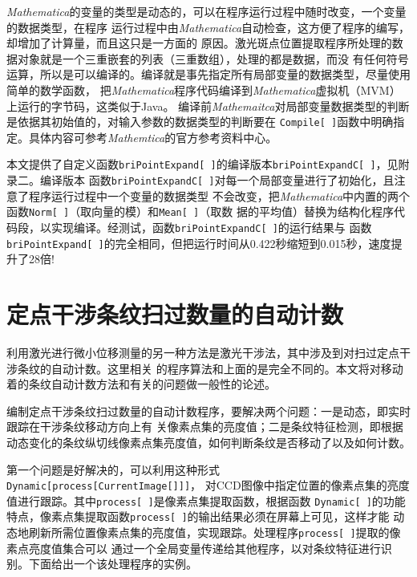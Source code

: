 \documentclass[UTF8,a4paper,12pt]{article}
\begin{document}
\textit{Mathematica}的变量的类型是动态的，可以在程序运行过程中随时改变，一个变量的数据类型，在程序
运行过程中由\textit{Mathematica}自动检查，这方便了程序的编写，却增加了计算量，而且这只是一方面的
原因。激光斑点位置提取程序所处理的数据对象就是一个三重嵌套的列表（三重数组），处理的都是数据，而没
有任何符号运算，所以是可以编译的。编译就是事先指定所有局部变量的数据类型，尽量使用简单的数学函数，
把\textit{Mathematica}程序代码编译到\textit{Mathematica}虚拟机（MVM）上运行的字节码，这类似于Java。
编译前\textit{Mathemaitca}对局部变量数据类型的判断是依据其初始值的，对输入参数的数据类型的判断要在
\verb|Compile[ ]|函数中明确指定。具体内容可参考\textit{Mathemtica}的官方参考资料中心。

本文提供了自定义函数\verb|briPointExpand[ ]|的编译版本\verb|briPointExpandC[ ]|，见附录二。编译版本
函数\verb|briPointExpandC[ ]|对每一个局部变量进行了初始化，且注意了程序运行过程中一个变量的数据类型
不会改变，把\textit{Mathematica}中内置的两个函数\verb|Norm[ ]|（取向量的模）和\verb|Mean[ ]|（取数
据的平均值）替换为结构化程序代码段，以实现编译。经测试，函数\verb|briPointExpandC[ ]|的运行结果与
函数\verb|briPointExpand[ ]|的完全相同，但把运行时间从0.422秒缩短到0.015秒，速度提升了28倍!

\section{定点干涉条纹扫过数量的自动计数}
利用激光进行微小位移测量的另一种方法是激光干涉法，其中涉及到对扫过定点干涉条纹的自动计数。这里相关
的程序算法和上面的是完全不同的。本文将对移动着的条纹自动计数方法和有关的问题做一般性的论述。

编制定点干涉条纹扫过数量的自动计数程序，要解决两个问题：一是动态，即实时跟踪在干涉条纹移动方向上有
关像素点集的亮度值；二是条纹特征检测，即根据动态变化的条纹纵切线像素点集亮度值，如何判断条纹是否移动了以及如何计数。

第一个问题是好解决的，可以利用这种形式\verb|Dynamic[process[CurrentImage[]]]|，
对CCD图像中指定位置的像素点集的亮度值进行跟踪。其中\verb|process[ ]|是像素点集提取函数，根据函数
\verb|Dynamic[ ]|的功能特点，像素点集提取函数\verb|process[ ]|的输出结果必须在屏幕上可见，这样才能
动态地刷新所需位置像素点集的亮度值，实现跟踪。处理程序\verb|process[ ]|提取的像素点亮度值集合可以
通过一个全局变量传递给其他程序，以对条纹特征进行识别。下面给出一个该处理程序的实例。
\end{document}
